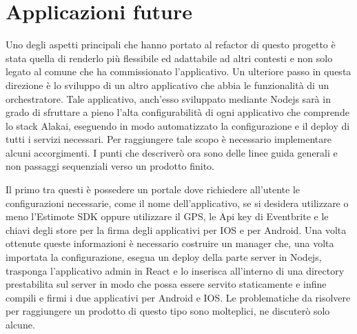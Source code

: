 \chapter{Applicazioni future}
\label{cha:intro}
\vspace{5mm}

Uno degli aspetti principali che hanno portato al refactor di questo progetto è stata quella di renderlo più flessibile ed adattabile ad altri contesti e non solo legato al comune che ha commissionato l’applicativo. Un ulteriore passo in questa direzione è lo sviluppo di un altro applicativo che abbia le funzionalità di un orchestratore. Tale applicativo, anch'esso sviluppato mediante Nodejs sarà in grado di sfruttare a pieno l’alta configurabilità di ogni applicativo che comprende lo stack Alakai, eseguendo in modo automatizzato la configurazione e il deploy di tutti i servizi necessari. Per raggiungere tale scopo è necessario implementare alcuni accorgimenti. I punti che descriverò ora sono delle linee guida generali e non passaggi sequenziali verso un prodotto finito.\vspace{5mm}

Il primo tra questi è possedere un portale dove richiedere all’utente le configurazioni necessarie, come il nome dell’applicativo, se si desidera utilizzare o meno l’Estimote SDK oppure utilizzare il GPS, le Api key di Eventbrite e le chiavi degli store per la firma degli applicativi per IOS e per Android. Una volta ottenute queste informazioni è necessario costruire un manager che, una volta importata la configurazione, esegua un deploy della parte server in Nodejs, trasponga l’applicativo admin in React e lo inserisca all’interno di una directory prestabilita sul server in modo che possa essere servito staticamente e infine compili e firmi i due applicativi per Android e IOS. Le problematiche da risolvere per raggiungere un prodotto di questo tipo sono molteplici, ne discuterò solo alcune.\vspace{5mm}

